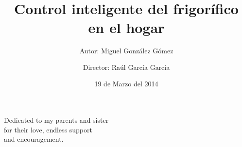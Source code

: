 \documentclass[a4paper,12pt,oneside]{book}
\newenvironment{dedication}
{
   \thispagestyle{empty}
   \vspace*{\stretch{1}}
   \hfill\begin{minipage}[t]{0.66\textwidth}
   \raggedright
}
{
   \end{minipage}
   \vspace*{\stretch{3}}
}
\begin{document}
\title{\Huge \textbf{Control inteligente del frigorífico en el hogar}}
\author{Autor: Miguel González Gómez \and Director: Raúl García García}
\date{19 de Marzo del 2014}

\frontmatter
\maketitle

\begin{dedication}
Dedicated to my parents and sister \\
for their love, endless support \\
and encouragement.
\end{dedication}






\frontmatter
\tableofcontents




\end{document}
